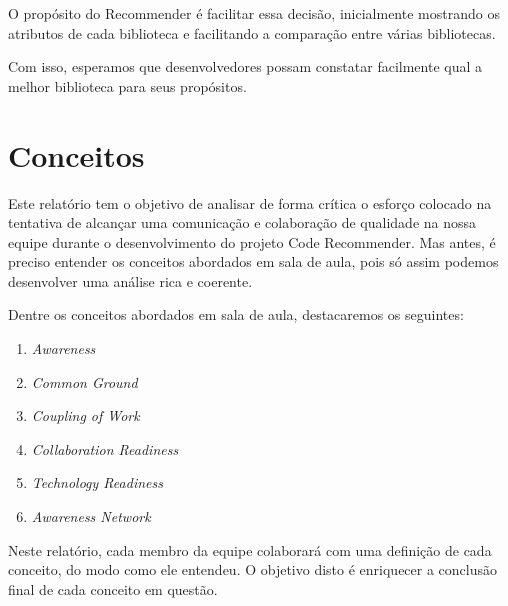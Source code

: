 \documentclass{acm_proc_article-sp}
\begin{document}
O propósito do Recommender é facilitar essa decisão, inicialmente mostrando os atributos de cada biblioteca e facilitando a comparação entre várias bibliotecas.

Com isso, esperamos que desenvolvedores possam constatar facilmente qual a melhor
biblioteca para seus propósitos.


\section{Conceitos}


Este relatório tem o objetivo de analisar de forma crítica o esforço colocado na tentativa de alcançar uma comunicação e colaboração de qualidade na nossa equipe durante o desenvolvimento do projeto Code Recommender. Mas antes, é preciso entender os conceitos abordados em sala de aula, pois só assim podemos desenvolver uma análise rica e coerente.

Dentre os conceitos abordados em sala de aula, destacaremos os seguintes:

\begin{enumerate}
\item \textsl{Awareness}
\item \textsl{Common Ground}
\item \textsl{Coupling of Work}
\item \textsl{Collaboration Readiness}
\item \textsl{Technology Readiness}
\item \textsl{Awareness Network}
\end{enumerate}
Neste relatório, cada membro da equipe colaborará com uma definição de cada conceito, do modo como ele entendeu. O objetivo disto é enriquecer a conclusão final de cada conceito em questão.
\end{document}

